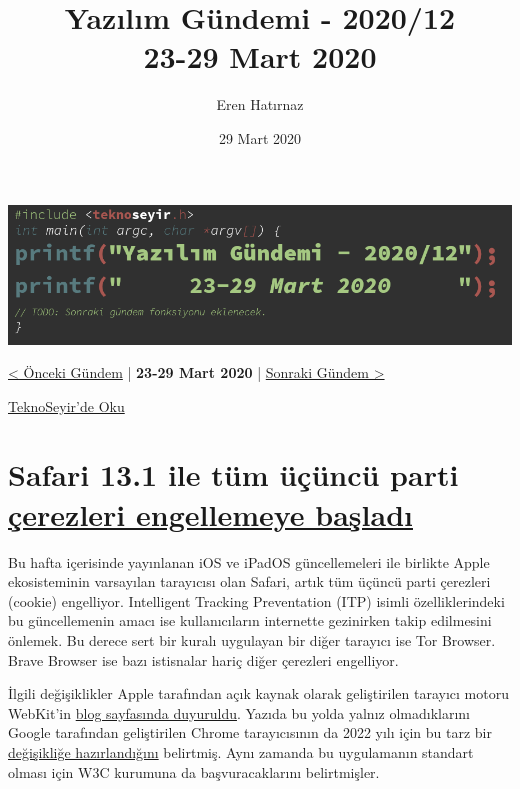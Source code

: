 \documentclass[11pt]{article}
\author{Eren Hatırnaz}
\date{29 Mart 2020}
\title{Yazılım Gündemi - 2020/12\\\medskip
\large 23-29 Mart 2020}
\begin{document}
\maketitle
\tableofcontents \clearpage\shorthandoff{=}

\begin{center}
\includegraphics[width=.9\linewidth]{gorseller/yazilim-gundemi-banner.png}
\end{center}

\begin{center}
\href{../11/yazilim-gundemi-2020-11.pdf}{< Önceki Gündem} | \textbf{23-29 Mart 2020} | \href{../13/yazilim-gundemi-2020-13.pdf}{Sonraki Gündem >}

\href{https://teknoseyir.com/blog/yazilim-gundemi-2020-12}{TeknoSeyir'de Oku}
\end{center}

\section{Safari 13.1 ile tüm üçüncü parti \href{https://www.engadget.com/2020-03-24-safari-blocks-all-third-party-cookies-by-default.html}{çerezleri engellemeye başladı}}
\label{sec:orgab5f824}
Bu hafta içerisinde yayınlanan iOS ve iPadOS güncellemeleri ile birlikte Apple
ekosisteminin varsayılan tarayıcısı olan Safari, artık tüm üçüncü parti
çerezleri (cookie) engelliyor. Intelligent Tracking Preventation (ITP) isimli
özelliklerindeki bu güncellemenin amacı ise kullanıcıların internette
gezinirken takip edilmesini önlemek. Bu derece sert bir kuralı uygulayan bir
diğer tarayıcı ise Tor Browser. Brave Browser ise bazı istisnalar hariç diğer
çerezleri engelliyor.

İlgili değişiklikler Apple tarafından açık kaynak olarak geliştirilen tarayıcı
motoru WebKit'in \href{https://webkit.org/blog/10218/full-third-party-cookie-blocking-and-more/}{blog sayfasında duyuruldu}. Yazıda bu yolda yalnız
olmadıklarını Google tarafından geliştirilen Chrome tarayıcısının da 2022 yılı
için bu tarz bir \href{https://blog.chromium.org/2020/01/building-more-private-web-path-towards.html}{değişikliğe hazırlandığını} belirtmiş. Aynı zamanda bu
uygulamanın standart olması için W3C kurumuna da başvuracaklarını
belirtmişler.
\end{document}
